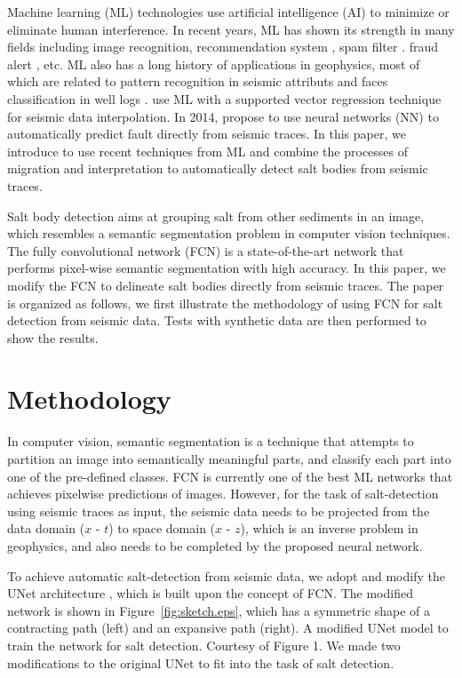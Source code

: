 \documentclass[manuscript,ulem,graphix,revised]{geophysics}
\begin{document}
Machine learning (ML) technologies use artificial intelligence (AI) to minimize or eliminate human interference. In recent years, ML has shown its strength in many fields including image recognition, recommendation system \citep{Bobadilla13}, spam filter \citep{Androutsopoulos00}. fraud alert \citep{Ravisankar11}, etc. ML also has a long history of applications in geophysics, most of which are related to pattern recognition in seismic attributs  \citep{zeng04,zhao15} and faces classification in well logs \citep{lim05,hall16}. \citet{jia17} use ML with a supported vector regression technique for seismic data interpolation. In 2014, \citet{zhang14} propose to use neural networks (NN) to automatically predict fault directly from seismic traces. In this paper, we introduce to use recent techniques from ML and combine the processes of migration and interpretation to automatically detect salt bodies from seismic traces. 

Salt body detection aims at grouping salt from other sediments in an image, which resembles a semantic segmentation problem in computer vision techniques. 
The fully convolutional network (FCN) \citep{long15} is a state-of-the-art network that performs pixel-wise semantic segmentation with high accuracy. In this paper, we modify the FCN to delineate salt bodies directly from seismic traces. The paper is organized as follows, we first illustrate the methodology of using FCN for salt detection from seismic data. Tests with synthetic data are then performed to show the results. 


\section{Methodology}
In computer vision, semantic segmentation is a technique that attempts to partition an image into semantically meaningful parts, and classify each part into one of the pre-defined classes. FCN is currently one of the best ML networks that achieves pixelwise predictions of images. However, for the task of salt-detection using seismic traces as input, the seismic data needs to be projected from the data domain ($x$ - $t$) to space domain ($x$ - $z$), which is an inverse problem in geophysics, and also needs to be completed by the proposed neural network.

To achieve automatic salt-detection from seismic data, we adopt and modify the UNet architecture \citep{ronneberger15}, which is built upon the concept of FCN. The modified network is shown in Figure~\ref{fig:sketch.eps}, which has a symmetric shape of a contracting path (left) and an expansive path (right).
{A modified UNet model to train the network for salt detection. Courtesy of \citet{ronneberger15} Figure 1.}
We made two modifications to the original UNet to fit into the task of salt detection. 
\end{document}
